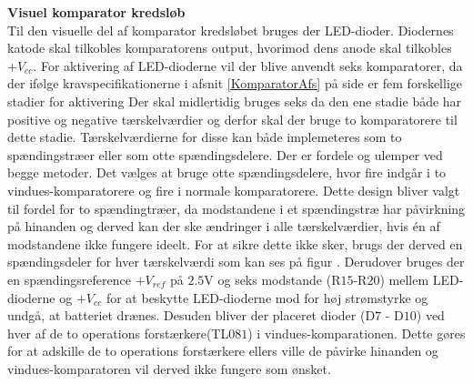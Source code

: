 \noindent\textbf{Visuel komparator kredsløb} \\
Til den visuelle del af komparator kredsløbet bruges der LED-dioder. Diodernes katode skal tilkobles komparatorens output, hvorimod dens anode skal tilkobles $+V_{cc}$. For aktivering af LED-dioderne vil der blive anvendt seks komparatorer, da der ifølge kravspecifikationerne i afsnit \ref{KomparatorAfs} på side \pageref{KomparatorAfs} er fem forskellige stadier for aktivering Der skal midlertidig bruges seks da den ene stadie både har positive og negative tærskelværdier og derfor skal der bruge to komparatorere til dette stadie. Tærskelværdierne for disse kan både implemeteres som to spændingstræer eller som otte spændingsdelere. Der er fordele og ulemper ved begge metoder. Det vælges at bruge otte spændingsdelere, hvor fire indgår i to vindues-komparatorere og fire i normale komparatorere. 
Dette design bliver valgt til fordel for to spændingtræer, da modstandene i et spændingstræ har påvirkning på hinanden og derved kan der ske ændringer i alle tærskelværdier, hvis én af modstandene ikke fungere ideelt. For at sikre dette ikke sker, brugs der derved en spændingsdeler for hver tærskelværdi som kan ses på figur .
Derudover bruges der en spændingsreference $+V_{ref}$ på $2.5$V og  seks modstande (R$15$-R$20$) mellem LED-dioderne og $+V_{cc}$ for at beskytte LED-dioderne mod for høj strømstyrke og undgå, at batteriet drænes. Desuden bliver der placeret  dioder (D$7$ - D$10$) ved hver af de to operations forstærkere(TL$081$) i vindues-komparationen. Dette gøres for at adskille de to operations forstærkere ellers ville de påvirke hinanden og vindues-komparatoren vil derved ikke fungere som ønsket.  

